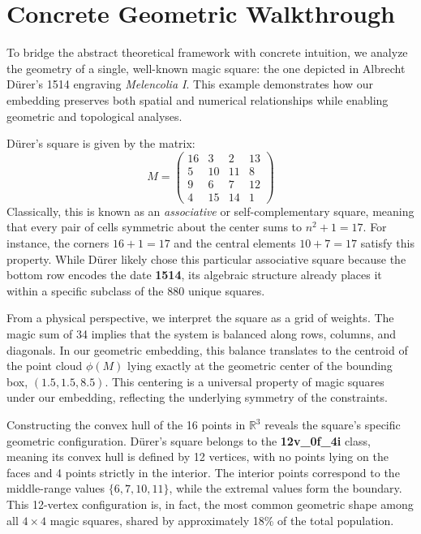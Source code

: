 \section{Concrete Geometric Walkthrough}\label{sec:walkthrough}

To bridge the abstract theoretical framework with concrete intuition, we analyze the geometry of a single, well-known magic square: the one depicted in Albrecht Dürer's 1514 engraving \textit{Melencolia I}. This example demonstrates how our embedding preserves both spatial and numerical relationships while enabling geometric and topological analyses.

Dürer's square is given by the matrix:
\[
M = \begin{pmatrix}
16 & 3 & 2 & 13 \\
5 & 10 & 11 & 8 \\
9 & 6 & 7 & 12 \\
4 & 15 & 14 & 1
\end{pmatrix}
\]
Classically, this is known as an \textit{associative} or self-complementary square, meaning that every pair of cells symmetric about the center sums to $n^2 + 1 = 17$. For instance, the corners $16+1=17$ and the central elements $10+7=17$ satisfy this property. While Dürer likely chose this particular associative square because the bottom row encodes the date \textbf{1514}, its algebraic structure already places it within a specific subclass of the 880 unique squares.

From a physical perspective, we interpret the square as a grid of weights. The magic sum of 34 implies that the system is balanced along rows, columns, and diagonals. In our geometric embedding, this balance translates to the centroid of the point cloud $\phi(M)$ lying exactly at the geometric center of the bounding box, $(1.5, 1.5, 8.5)$. This centering is a universal property of magic squares under our embedding, reflecting the underlying symmetry of the constraints.

Constructing the convex hull of the 16 points in $\mathbb{R}^3$ reveals the square's specific geometric configuration. Dürer's square belongs to the \textbf{12v\_0f\_4i} class, meaning its convex hull is defined by 12 vertices, with no points lying on the faces and 4 points strictly in the interior. The interior points correspond to the middle-range values $\{6, 7, 10, 11\}$, while the extremal values form the boundary. This 12-vertex configuration is, in fact, the most common geometric shape among all $4 \times 4$ magic squares, shared by approximately 18\% of the total population.

